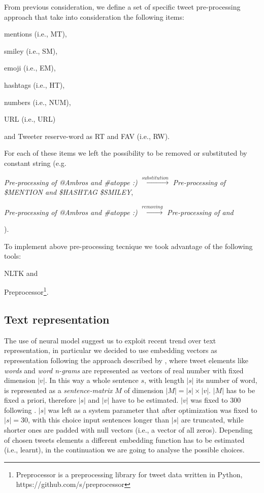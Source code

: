 From previous consideration, we define a set of specific tweet pre-processing approach that take into consideration the following items:
\begin{enumerate*}
\item mentions (i.e., MT),
\item smiley (i.e., SM),
\item emoji (i.e., EM),
\item hashtags (i.e., HT),
\item numbers (i.e., NUM),
\item URL (i.e., URL)
\item and Tweeter reserve-word as RT and FAV (i.e., RW).
\end{enumerate*}

For each of these items we left the possibility to be removed or substituted by constant string (e.g.
\begin{enumerate*}
\item \emph{Pre-processing of @Ambros and \#atoppe :)} $\xrightarrow{substitution} $ \emph{Pre-processing of \$MENTION and \$HASHTAG \$SMILEY},
\item \emph{Pre-processing of @Ambros and \#atoppe :)} $\xrightarrow{removing} $ \emph{Pre-processing of and}
\end{enumerate*}
).

To implement above pre-processing tecnique we took advantage of the following tools:
\begin{enumerate*}
\item NLTK \cite{nltk} and 
\item Preprocessor\footnote{Preprocessor is a preprocessing library for tweet data written in Python, https://github.com/s/preprocessor}.
\end{enumerate*}



\subsection{Text representation} \label{subsec:representation}
The use of neural model suggest us to exploit recent trend over text representation, in particular we decided to use embedding vectors as representation following the approach described by \cite{bojanowski2016enriching}, where tweet elements like \emph{words} and \emph{word n-grams} are represented as vectors of real number with fixed dimension $|v|$.
In this way a whole sentence $s$, with length $|s|$ its number of word, is represented as a \emph{sentence-matrix} $M$ of dimension $|M| = |s| \times |v|$. $|M|$ has to be fixed a priori, therefore $|s|$ and $|v|$ have to be estimated. $|v|$ was fixed to 300 following \cite{bojanowski2016enriching}. $|s|$ was left as a system parameter that after optimization was fixed to $|s| = 30$, with this choice 
input sentences longer than $|s|$ are truncated, while shorter ones are padded with null vectors (i.e., a vector of all zeros).
Depending of chosen tweets elements a different embedding function has to be estimated (i.e., learnt), in the continuation we are going to analyse the possible choices.

